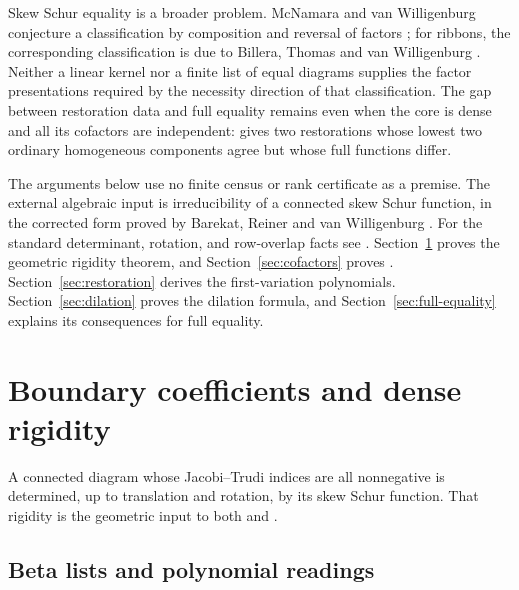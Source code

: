 \documentclass[11pt,a4paper]{amsart}
\numberwithin{equation}{section}
\theoremstyle{plain}
\theoremstyle{definition}
\begin{document}
Skew Schur equality is a broader problem.  McNamara and van Willigenburg
conjecture a classification by composition and reversal of factors
\cite{McNamara2009Classification}; for ribbons, the corresponding
classification is due to Billera, Thomas and van Willigenburg
\cite{Billera2006DecomposableCompositions}.
Neither a linear kernel nor a finite list of equal diagrams supplies the
factor presentations required by the necessity direction of that
classification.  The gap between restoration data and full equality remains
even when the core is dense and all its cofactors are independent:
 gives two restorations whose lowest two ordinary
homogeneous components agree but whose full functions differ.

The arguments below use no finite census or rank certificate as a premise.
The external algebraic input is irreducibility of a connected skew Schur
function, in the corrected form proved by Barekat, Reiner and van Willigenburg
\cite[Thm.~1]{Barekat2009CoincidencesCorrigendum}.  For the standard determinant,
rotation, and row-overlap facts see
\cite{Macdonald1995SymmetricFunctions,Reiner2007Coincidences}.
Section~\ref{sec:boundary} proves the geometric rigidity theorem, and
Section~\ref{sec:cofactors} proves .
Section~\ref{sec:restoration} derives the first-variation polynomials.
Section~\ref{sec:dilation} proves the dilation formula, and
Section~\ref{sec:full-equality} explains its consequences for full equality.

\section{Boundary coefficients and dense rigidity}\label{sec:boundary}

A connected diagram whose Jacobi--Trudi indices are all nonnegative is
determined, up to translation and rotation, by its skew Schur function.
That rigidity is the geometric input
to both  and .

\subsection{Beta lists and polynomial readings}
\end{document}
